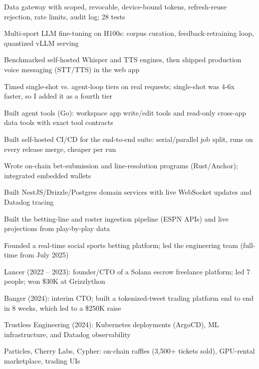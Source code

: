 \documentclass[print]{jack-resume}
\begin{document}
\begin{tightemize}
    \item Data gateway with scoped, revocable, device-bound tokens, refresh-reuse rejection, rate limits, audit log; 28 tests
    \item Multi-sport LLM fine-tuning on H100s: corpus curation, feedback-retraining loop, quantized vLLM serving
    \item Benchmarked self-hosted Whisper and TTS engines, then shipped production voice messaging (STT/TTS) in the web app
    \item Timed single-shot vs. agent-loop tiers on real requests; single-shot was 4-6x faster, so I added it as a fourth tier
    \item Built agent tools (Go): workspace app write/edit tools and read-only cross-app data tools with exact tool contracts
    \item Built self-hosted CI/CD for the end-to-end suite: serial/parallel job split, runs on every release merge, cheaper per run
\end{tightemize}
\sectionsep

\begin{tightemize}
    \item Wrote on-chain bet-submission and line-resolution programs (Rust/Anchor); integrated embedded wallets
    \item Built NestJS/Drizzle/Postgres domain services with live WebSocket updates and Datadog tracing
    \item Built the betting-line and roster ingestion pipeline (ESPN APIs) and live projections from play-by-play data
    \item Founded a real-time social sports betting platform; led the engineering team (full-time from July 2025)
\end{tightemize}
\sectionsep

\begin{tightemize}
    \item Lancer (2022 – 2023): founder/CTO of a Solana escrow freelance platform; led 7 people; won \$30K at Grizzlython
    \item Banger (2024): interim CTO; built a tokenized-tweet trading platform end to end in 8 weeks, which led to a \$250K raise
    \item Trustless Engineering (2024): Kubernetes deployments (ArgoCD), ML infrastructure, and Datadog observability
    \item Particles, Cherry Labs, Cypher: on-chain raffles (3,500+ tickets sold), GPU-rental marketplace, trading UIs
\end{tightemize}
\sectionsep
\end{document}
